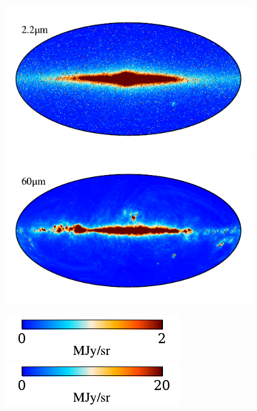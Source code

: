 \documentclass{aa}
\begin{document}
\begin{figure}
    \includegraphics[width=0.8\columnwidth]{figs/freq_maps/freq_02_c0001_000019.pdf}\includegraphics[width=0.8\columnwidth]{figs/freq_maps/freq_07_c0001_000019.pdf}
    \vspace*{-0.5cm}

    \includegraphics[width=0.4\columnwidth]{figs/freq_maps/freq_cbar_02_c0001_000019.pdf}\hspace{3.6cm}\includegraphics[width=0.4\columnwidth]{figs/freq_maps/freq_cbar_07_c0001_000019.pdf}


\end{figure}
\end{document}
